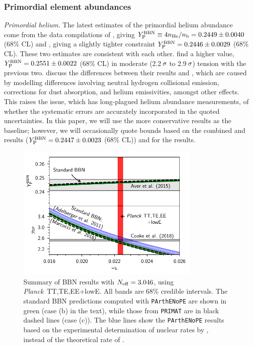 \documentclass[longauth,traditabstract]{aa}
\def\Planck{\textit{Planck}}
\def\,{\thinspace}
\newcommand{\mksym}[1]{\ifmmode {\rm #1}\else #1\fi}
\newcommand{\dataplus}{\allowbreak+}
\newcommand{\TTTEEE}{\mksym{TT,TE,EE}}
\newcommand{\planckTTTEEEonly}{\planck\ \TTTEEE}
\newcommand{\lowE}{\mksym{lowE}}
\newcommand{\parthenope}{{\tt PArthENoPE}}
\newcommand{\planckall}{\planckTTTEEEonly\dataplus\lowE}
\newcommand{\ypbbn}{Y_{\text{P}}^{\rm BBN}}
\newcommand{\nnu}{N_{\rm eff}}
\providecommand{\text}[1]{\rm{#1}}
\newcommand{\planck}{\Planck}
\begin{document}
\subsubsection{Primordial element abundances}
\label{subsec:bbn}

{\it Primordial helium.} The latest estimates of the primordial helium abundance come from the data compilations of \citet{Aver:2015iza}, giving $\ypbbn \equiv 4 n_{\rm He}/n_{\rm b} = 0.2449 \pm 0.0040$ (68\,\% CL) and
\citet{Peimbert:2016bdg}, giving a slightly tighter constraint $\ypbbn = 0.2446 \pm 0.0029$ (68\,\% CL). These two estimates are consistent with each other. \citet{Izotov:2014fga} find a higher value, $\ypbbn = 0.2551 \pm 0.0022$ (68\,\% CL) in moderate (2.2$\,\sigma$ to 2.9$\,\sigma$) tension with the previous two.
\citet{Aver:2015iza} discuss the differences between their results and \citet{Izotov:2014fga}, which are caused by modelling differences involving neutral hydrogen
collisional emission, corrections for dust absorption, and helium emissivities, amongst other effects. This raises the issue, which has long-plagued helium abundance measurements, of whether
the systematic errors are accurately incorporated in the quoted uncertainties.  In this paper, we will use the more conservative \citet{Aver:2015iza} results as the baseline; however,
we will occasionally quote bounds based on the combined \citet{Aver:2015iza} and \citet{Peimbert:2016bdg} results ($\ypbbn = 0.2447 \pm 0.0023$ (68\,\% CL)) and for
the \citet{Izotov:2014fga} results.


\begin{figure}[htbp!]
\includegraphics[width=9.0cm]{bbn_a.pdf}
\caption{Summary of BBN results with $\nnu=3.046$, using \planckall. All bands are 68\,\% credible intervals. The standard BBN predictions computed with \parthenope{} are shown in green (case (b) in the text), while those from {\tt PRIMAT} are in black dashed lines (case (c)). The blue lines show the \parthenope{} results based on the experimental determination of nuclear rates by \cite{Adelberger:2010qa}, instead of the theoretical rate of \citet[][case (a)]{Marcucci:2015yla}.}
\label{fig:bbn_a}
\end{figure}
\vspace{0.5cm}
\end{document}
